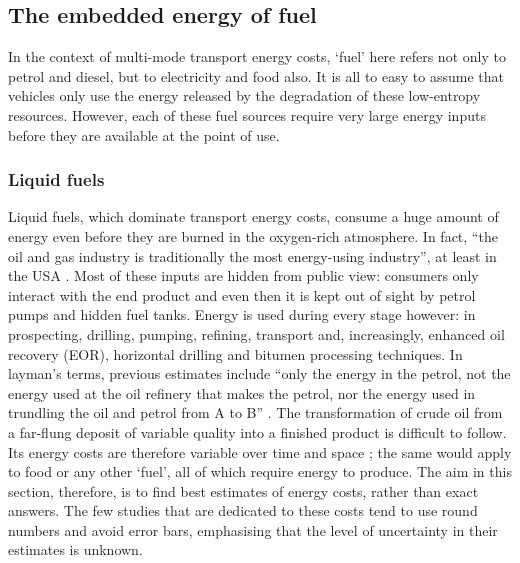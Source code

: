 \subsection{The embedded energy of fuel} 
\label{sfuelem}
In the context of multi-mode transport energy costs, `fuel' here refers not
only to petrol and diesel, but to electricity and food also. It is all to easy
to assume that vehicles only use the energy released by the degradation of
these low-entropy resources. However, each of these fuel sources require very
large energy inputs before they are available at the point of use.

\subsubsection{Liquid fuels} 
Liquid fuels, which dominate transport energy costs, consume a huge amount of
energy even before they are burned in the oxygen-rich atmosphere. In fact,
``the oil and gas industry is traditionally the most energy-using industry'',
at least in the USA \citep{Guilford2011}. Most of these
inputs are hidden from public view: consumers only interact with the end
product and even then it is kept out of sight by petrol pumps and hidden fuel
tanks. Energy is used during every stage however: in prospecting, drilling,
pumping, refining, transport and, increasingly, enhanced oil recovery (EOR),
horizontal drilling and bitumen processing techniques. In layman's terms,
previous estimates include ``only the energy in the
petrol, not the energy used at the oil refinery that makes the petrol, nor the
energy used in trundling the oil and petrol from A to B''
\citep[p.~104]{MacKay2009}. The transformation of
crude oil from a far-flung deposit of variable quality into a finished product
is difficult to follow. Its energy costs are therefore variable over time and
space \citep{Cleveland2005}; the same would apply to food or any other `fuel',
all of which require energy to produce. The aim in this section, therefore, is
to find best estimates of energy costs, rather than exact answers. The
few studies that are dedicated to these costs tend to use round numbers and
avoid error bars, emphasising that the level of uncertainty in their estimates
is unknown.

